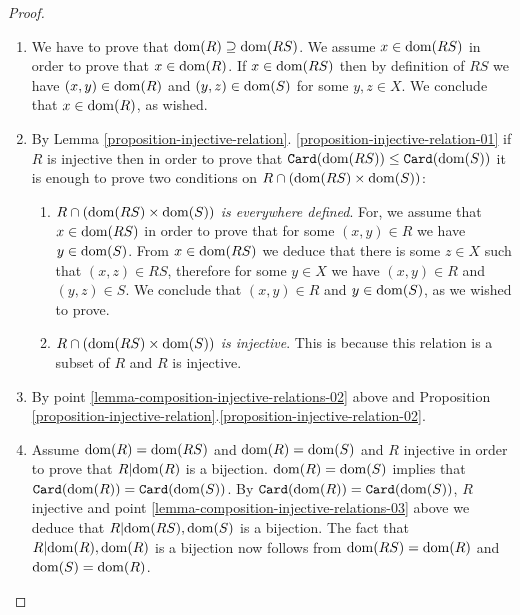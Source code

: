 \documentclass{lmcs}
\begin{document}
\begin{proof}

\begin{enumerate}
\item
We have to prove that ${\rm dom}(R) \supseteq {\rm dom}(RS)$. 
We assume $x \in {\rm dom}(RS)$ in order to prove that $x \in {\rm dom}(R)$.
If  $x \in {\rm dom}(RS)$ then by definition of $RS$ 
we have $(x,y) \in {\rm dom}(R)$ and $(y,z) \in {\rm dom}(S)$ for some $y,z \in X$.
We conclude that $x \in {\rm dom}(R)$, as wished.

\item
By Lemma 
\ref{proposition-injective-relation}.
\ref{proposition-injective-relation-01} 
if $R$ is injective then in order to prove that
${\tt Card}({\rm dom}(RS)) \le {\tt Card}({\rm dom}(S))$ it is enough to prove two conditions
on $R \cap ({\rm dom}(RS) \times {\rm dom}(S))$:

\begin{enumerate}
\item
\emph{$R \cap ({\rm dom}(RS) \times {\rm dom}(S))$ is everywhere defined}.
For, we assume that $x \in {\rm dom}(RS)$ in order to prove that
for some $(x,y) \in R$ we have $y \in {\rm dom}(S)$.
From $x \in {\rm dom}(RS)$ we deduce that there is some $z \in X$ 
such that $(x,z) \in RS$, therefore for some $y \in X$ we have  $(x,y) \in R$ 
and $(y,z) \in S$. We conclude that $(x,y) \in R$ and  
$y \in {\rm dom}(S)$, as we wished to prove.

\item
\emph{$R \cap ({\rm dom}(RS) \times {\rm dom}(S))$ is injective}. This
is  because this relation is a subset of $R$ and $R$ is injective.
\end{enumerate}

\item
By point \ref{lemma-composition-injective-relations-02} above 
and Proposition 
\ref{proposition-injective-relation}.\ref{proposition-injective-relation-02}.

\item
Assume ${\rm dom}(R)={\rm dom}(RS)$ and ${\rm dom}(R)={\rm dom}(S)$ 
and $R$ injective in order to prove that $R{|} {\rm dom}(R)$ is a bijection. 
${\rm dom}(R)={\rm dom}(S)$ implies that ${\tt Card}({\rm dom}(R))={\tt Card}({\rm dom}(S))$.
By ${\tt Card}({\rm dom}(R))={\tt Card}({\rm dom}(S))$, $R$ injective
and point \ref{lemma-composition-injective-relations-03} above we deduce 
that $R{|} {\rm dom}(RS), {\rm dom}(S)$ is a bijection. The fact that
$R{|} {\rm dom}(R), {\rm dom}(R)$ is a bijection now follows from
${\rm dom}(RS) = {\rm dom}(R)$ and ${\rm dom}(S)={\rm dom}(R)$.

\end{enumerate}
\end{proof}
\end{document}
